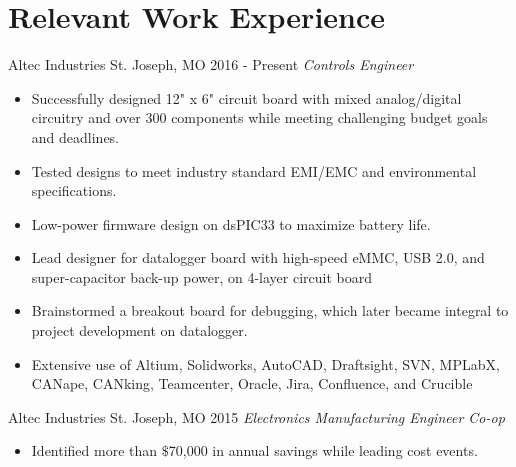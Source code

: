 \documentclass[]{bergman-cv} %
\begin{document}
\section{Relevant Work Experience}
\begin{entrylist}
\entry
{Altec Industries}
{St. Joseph, MO}
{2016 - Present}
{\emph{Controls Engineer}}
{\begin{itemize}	\setlength\itemsep{0.25em} \vspace*{-5pt}
	\item Successfully designed 12" x 6" circuit board with mixed analog/digital circuitry and over 300 components while meeting challenging budget goals and deadlines.
	
	
	\item Tested designs to meet industry standard EMI/EMC and environmental specifications.
	\item Low-power firmware design on dsPIC33 to maximize battery life.
	\item Lead designer for datalogger board with high-speed eMMC, USB 2.0, and super-capacitor back-up power, on 4-layer circuit board
	\item Brainstormed a breakout board for debugging, which later became integral to project development on datalogger.
	\item Extensive use of Altium, Solidworks, AutoCAD, Draftsight, SVN, MPLabX, CANape, CANking, Teamcenter, Oracle, Jira, Confluence, and Crucible
\end{itemize}}
\vspace{6pt}
\entry
{Altec Industries}
{St. Joseph, MO}
{2015}
{\emph{Electronics Manufacturing Engineer Co-op}}
{\begin{itemize}	\setlength\itemsep{0.25em} \vspace*{-5pt}
	\item Identified more than $\$$70,000 in annual savings while leading cost events.


\end{itemize}}
\end{entrylist}
\end{document}
